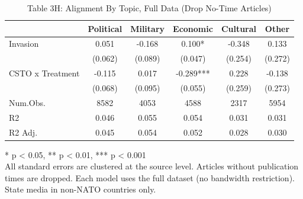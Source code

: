\begin{table}[!t]
\caption{Table 3H: Alignment By Topic, Full Data (Drop No-Time Articles)} 
\fontsize{12.0pt}{14.4pt}\selectfont
\begin{tabular*}{\linewidth}{@{\extracolsep{\fill}}lccccc}
\toprule
  & Political & Military & Economic & Cultural & Other \\ 
\midrule\addlinespace[2.5pt]
Invasion & 0.051 & -0.168 & 0.100* & -0.348 & 0.133 \\ 
 & (0.062) & (0.089) & (0.047) & (0.254) & (0.272) \\ 
CSTO x Treatment & -0.115 & 0.017 & -0.289*** & 0.228 & -0.138 \\ 
{} & {(0.068)} & {(0.095)} & {(0.055)} & {(0.259)} & {(0.273)} \\ 
Num.Obs. & 8582 & 4053 & 4588 & 2317 & 5954 \\ 
R2 & 0.046 & 0.055 & 0.054 & 0.031 & 0.031 \\ 
R2 Adj. & 0.045 & 0.054 & 0.052 & 0.028 & 0.030 \\ 
\bottomrule
\end{tabular*}
\begin{minipage}{\linewidth}
* p < 0.05, ** p < 0.01, *** p < 0.001\\
All standard errors are clustered at the source level. Articles without
publication times are dropped. Each model uses the full dataset (no bandwidth
restriction). State media in non-NATO countries only.\\
\end{minipage}
\end{table}


